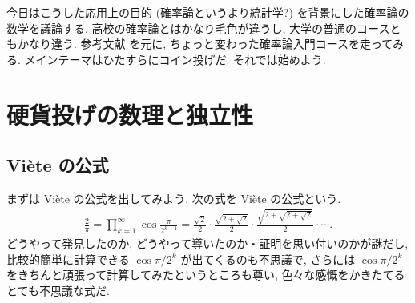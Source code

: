\documentclass[openany, a4paper, oneside]{jsbook}
\begin{document}
今日はこうした応用上の目的 (確率論というより統計学?) を背景にした確率論の数学を議論する.
高校の確率論とはかなり毛色が違うし, 大学の普通のコースともかなり違う.
参考文献 \cite{MarkKac1} を元に, ちょっと変わった確率論入門コースを走ってみる.
メインテーマはひたすらにコイン投げだ.
それでは始めよう.
\section{硬貨投げの数理と独立性}

\subsection{Vi\`ete の公式 \label{Hinashiro_math_party_1_probability_15}}

まずは Vi\`ete の公式を出してみよう.
次の式を Vi\`ete の公式という.
\begin{align}
 \frac{2}{\pi}
 =
 \prod_{k=1}^{\infty} \cos \frac{\pi}{2^{k+1}}
 =
 \frac{\sqrt{2}}{2} \cdot \frac{\sqrt{2 + \sqrt{2}}}{2} \cdot \frac{\sqrt{2 + \sqrt{2 + \sqrt{2}}}}{2} \cdot \cdots.
\end{align}
どうやって発見したのか, どうやって導いたのか・証明を思い付いのかが謎だし,
比較的簡単に計算できる $\cos \pi/2^k$ が出てくるのも不思議で,
さらには $\cos \pi / 2^k$ をきちんと頑張って計算してみたというところも尊い,
色々な感慨をかきたてるとても不思議な式だ.
\end{document}
